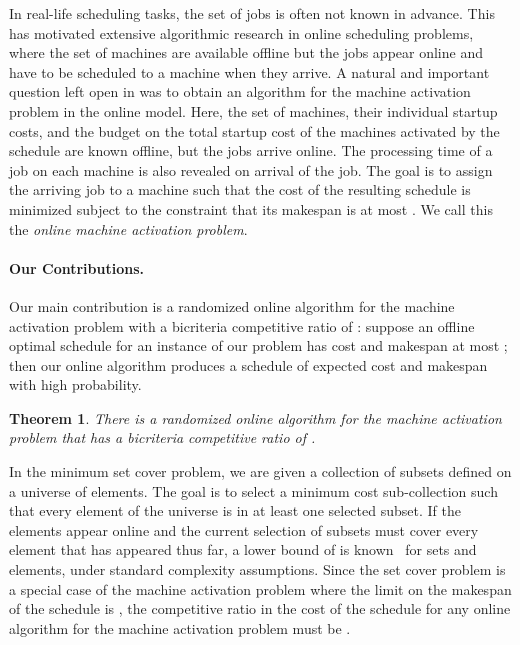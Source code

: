 \documentclass[11pt]{article}
\newtheorem{theorem}{Theorem}
\begin{document}
In real-life scheduling tasks, the set of jobs is often not known in advance.
This has motivated extensive algorithmic research in online scheduling problems, 
where the  set of machines are available offline but the jobs appear online 
and have to be scheduled to a machine when they arrive. A natural and 
important question left open in \cite{KhullerLS10} was to obtain an algorithm for 
the machine activation problem in the online model. Here, the set of machines,
their individual startup costs, and the budget on the total startup cost of the 
machines activated by the schedule are known offline, but the jobs arrive online.
The processing time of a job on each machine is also revealed on arrival of the 
job. The goal is to assign the arriving job to a machine such that the cost
of the resulting schedule is minimized subject to the constraint that its makespan
is at most . We call this the {\em online machine activation problem}.

\noindent
\paragraph{Our Contributions.} 
Our main contribution is a randomized online algorithm 
for the machine activation problem with a bicriteria competitive ratio of 
: suppose an offline 
optimal schedule for an instance of our problem has cost  and makespan at most ; 
then our online algorithm produces a schedule of expected
cost  and makespan 
with high probability. 
\begin{theorem}
\label{thm:main}
There is a randomized online algorithm for the machine activation problem that
has a bicriteria competitive ratio of .
\end{theorem}

In the minimum set cover problem, we are given a collection of subsets defined on 
a universe of elements. The goal is to select a minimum cost sub-collection
such that every element of the universe is in at least
one selected subset. If the elements appear online
and the current selection of subsets must cover every element that has
appeared thus far, a lower bound of  is 
known~\cite{Korman05}
for  sets and  elements, under standard complexity assumptions. 
Since the set cover problem is a special case of the machine activation problem
where the limit  on the makespan of the schedule is , 
the competitive ratio in the cost of the schedule for any online algorithm 
for the machine activation problem must be .
\end{document}
